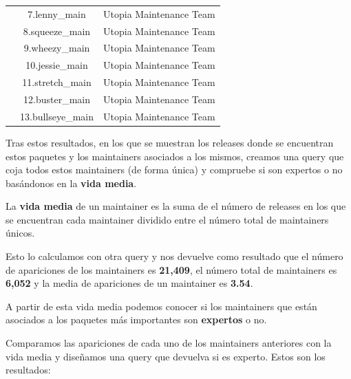 \documentclass[a4paper, 12pt]{book}
\begin{document}
\begin{longtable}{|c|c|c|}
		& 7.lenny\_main & Utopia Maintenance Team \\
		& 8.squeeze\_main & Utopia Maintenance Team \\
		& 9.wheezy\_main & Utopia Maintenance Team \\
		& 10.jessie\_main & Utopia Maintenance Team \\
		& 11.stretch\_main & Utopia Maintenance Team \\
		& 12.buster\_main & Utopia Maintenance Team \\
		& 13.bullseye\_main & Utopia Maintenance Team \\
		\hline
	\end{longtable}


Tras estos resultados, en los que se muestran los releases donde se encuentran estos paquetes y los maintainers asociados a los mismos, creamos una query que coja todos estos maintainers (de forma única) y compruebe si son expertos o no basándonos en la \textbf{vida media}.

La \textbf{vida media} de un maintainer es la suma de el número de releases en los que se encuentran cada maintainer dividido entre el número total de maintainers únicos. 

Esto lo calculamos con otra query y nos devuelve como resultado que el número de apariciones de los maintainers es \textbf{21,409}, el número total de maintainers es \textbf{6,052} y la media de apariciones de un maintainer es \textbf{3.54}.

A partir de esta vida media podemos conocer si los maintainers que están asociados a los paquetes más importantes son \textbf{expertos} o no.

Comparamos las apariciones de cada uno de los maintainers anteriores con la vida media y diseñamos una query que devuelva si es experto. Estos son los resultados:
\end{document}

